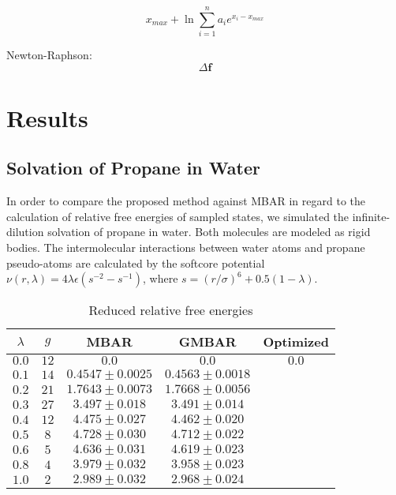 \documentclass[aip,jcp,preprint,amsmath,amssymb]{revtex4-1}
\newcommand{\vt}[1]{\boldsymbol{\mathbf{#1}}}           %
\begin{document}
\begin{equation}
x_{max} + \ln \sum_{i=1}^n a_i e^{x_i -x_{max}}
\end{equation}

Newton-Raphson:
\begin{equation*}
\Delta \vt f
\end{equation*}

\section{Results}

\subsection{Solvation of Propane in Water}

In order to compare the proposed method against MBAR in regard to the calculation of relative free energies of sampled states, we simulated the infinite-dilution solvation of propane in water. Both molecules are modeled as rigid bodies. The intermolecular interactions between water atoms and propane pseudo-atoms are calculated by the softcore potential\cite{Beutler_1994} $\nu(r,\lambda) = 4\lambda\epsilon(s^{-2} - s^{-1})$, where $s = (r/\sigma)^6 + 0.5 (1-\lambda)$.

\begin{table}
\caption{Reduced relative free energies}
\label{table:propane solvation}
\begin{ruledtabular}
\begin{tabular}{ccccc}
$\lambda$ & $g$ & MBAR & GMBAR & Optimized \\
\hline
$0.0$ & $12$ & $0.0$ & $0.0$ & $0.0$ \\
$0.1$ & $14$ & $0.4547 \pm 0.0025$ & $0.4563 \pm 0.0018$ \\
$0.2$ & $21$ & $1.7643 \pm 0.0073$ & $1.7668 \pm 0.0056$ \\
$0.3$ & $27$ &  $3.497 \pm 0.018$  &  $3.491 \pm 0.014$ \\
$0.4$ & $12$ &  $4.475 \pm 0.027$  &  $4.462 \pm 0.020$ \\
$0.5$ & $8$  &  $4.728 \pm 0.030$  &  $4.712 \pm 0.022$ \\
$0.6$ & $5$  &  $4.636 \pm 0.031$  &  $4.619 \pm 0.023$ \\
$0.8$ & $4$  &  $3.979 \pm 0.032$  &  $3.958 \pm 0.023$ \\
$1.0$ & $2$  &  $2.989 \pm 0.032$  &  $2.968 \pm 0.024$
\end{tabular}
\end{ruledtabular}
\end{table}
\end{document}
